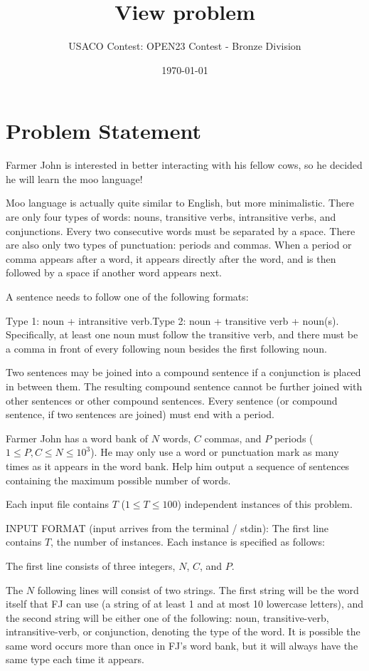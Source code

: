 \documentclass[12pt]{article}
\title{View problem}
\author{USACO Contest: OPEN23 Contest - Bronze Division}
\date{\today}
\begin{document}
\maketitle

\section*{Problem Statement}


Farmer John is interested in better interacting with his fellow cows, so he
decided he will learn the moo language!

Moo language is actually quite similar to English, but more minimalistic. There
are only four types of words: nouns, transitive verbs, intransitive verbs, and
conjunctions. Every two consecutive words must be separated by a space.  There
are also only two types of punctuation: periods and commas.  When a period or
comma appears after a word, it appears directly after the word, and is then
followed  by a space if another word appears next.

A sentence needs to follow one of the following formats:

Type 1: noun + intransitive verb.Type 2: noun + transitive verb + noun(s). Specifically, at least one noun
must follow the transitive verb, and there must be a comma in front of every 
following noun besides the first following noun.

Two sentences may be joined into a compound sentence if a conjunction is placed
in between them.  The resulting compound sentence cannot be further joined with
other sentences or other compound sentences.  Every sentence (or compound
sentence, if two sentences are joined) must end with a period.

Farmer John has a word bank of $N$ words, $C$ commas, and $P$ periods
($1 \leq P,C\le N \leq 10^3$). He may only use a word or punctuation mark as
many times as it appears in the word bank. Help him output a sequence of
sentences containing the maximum possible number of words.

Each input file contains $T$ ($1\le T\le 100$) independent instances of this
problem.

INPUT FORMAT (input arrives from the terminal / stdin):
The first line contains $T$, the number of instances. Each instance is specified
as follows:

The first line consists of three integers, $N$, $C$, and $P$.

The $N$ following lines will consist of two strings. The first string will be
the word itself that FJ can use (a string of at least 1 and at most 10 lowercase
letters), and the second string will be either one of the following: noun,
transitive-verb, intransitive-verb, or conjunction, denoting the type of the
word. It is possible the same word occurs more than once in FJ's word bank, but
it will always have the same type each time it appears.
\end{document}
